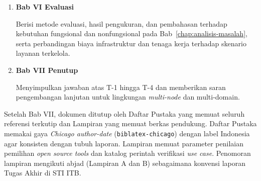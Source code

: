 \begin{enumerate}
    \vspace{0.5em}

    \item \textbf{Bab VI Evaluasi}

    Berisi metode evaluasi, hasil pengukuran, dan pembahasan terhadap kebutuhan fungsional dan nonfungsional pada Bab~\ref{chap:analisis-masalah}, serta perbandingan biaya infrastruktur dan tenaga kerja terhadap skenario layanan terkelola.

    \vspace{0.5em}

    \item \textbf{Bab VII Penutup}

    Menyimpulkan jawaban atas T-1 hingga T-4 dan memberikan saran pengembangan lanjutan untuk lingkungan \textit{multi-node} dan multi-domain.
\end{enumerate}

Setelah Bab VII, dokumen ditutup oleh Daftar Pustaka yang memuat seluruh referensi terkutip dan Lampiran yang memuat berkas pendukung. Daftar Pustaka memakai gaya \textit{Chicago author-date} (\texttt{biblatex-chicago}) dengan label Indonesia agar konsisten dengan tubuh laporan. Lampiran memuat parameter penilaian pemilihan \textit{open source tools} dan katalog perintah verifikasi \textit{use case}. Penomoran lampiran mengikuti abjad (Lampiran A dan B) sebagaimana konvensi laporan Tugas Akhir di STI ITB.
